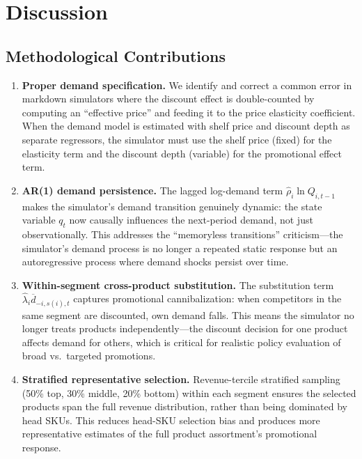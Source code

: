 \documentclass[12pt,a4paper]{article}
\begin{document}
\section{Discussion}
\label{sec:discussion}

\subsection{Methodological Contributions}

\begin{enumerate}[nosep]
\item \textbf{Proper demand specification.} We identify and correct
a common error in markdown simulators where the discount effect is
double-counted by computing an ``effective price'' and feeding it
to the price elasticity coefficient. When the demand model is
estimated with shelf price and discount depth as separate
regressors, the simulator must use the shelf price (fixed) for
the elasticity term and the discount depth (variable) for the
promotional effect term.

\item \textbf{AR(1) demand persistence.} The lagged log-demand term
$\hat{\rho}_i \ln Q_{i,t-1}$ makes the simulator's demand
transition genuinely dynamic: the state variable $q_t$ now causally
influences the next-period demand, not just observationally. This
addresses the ``memoryless transitions'' criticism---the simulator's
demand process is no longer a repeated static response but an
autoregressive process where demand shocks persist over time.

\item \textbf{Within-segment cross-product substitution.} The
substitution term $\hat{\lambda}_i \overline{d}_{-i,s(i),t}$
captures promotional cannibalization: when competitors in the same
segment are discounted, own demand falls. This means the simulator no
longer treats products independently---the discount decision for
one product affects demand for others, which is critical for
realistic policy evaluation of broad vs.\ targeted promotions.

\item \textbf{Stratified representative selection.} Revenue-tercile
stratified sampling (50\% top, 30\% middle, 20\% bottom) within
each segment ensures the selected products span the full revenue
distribution, rather than being dominated by head SKUs. This
reduces head-SKU selection bias and produces more representative
estimates of the full product assortment's promotional response.


\end{enumerate}
\end{document}
